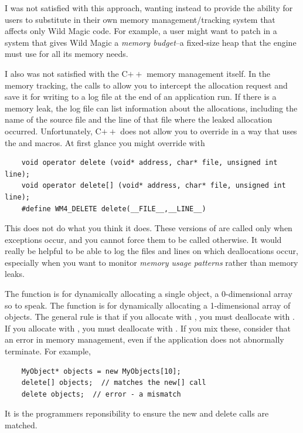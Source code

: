 \documentclass{article}
\begin{document}
I was not satisfied with this approach, wanting instead to provide the
ability for users to substitute in their own memory management/tracking
system that affects only Wild Magic code.  For example, a user might want
to patch in a system that gives Wild Magic a {\em memory budget}--a
fixed-size heap that the engine must use for all its memory needs.

I also was not satisfied with the C$++$ memory management itself.  In
the memory tracking, the calls to 
allow you to intercept the allocation request and save it for writing
to a log file at the end of an application run.  If there is a memory
leak, the log file can list information about the allocations, including
the name of the source file and the line of that file where the leaked
allocation occurred.  Unfortunately, C$++$ does not allow you to override
 in a way that uses the  and
 macros.  At first glance you might override with
\begin{verbatim}
    void operator delete (void* address, char* file, unsigned int line);
    void operator delete[] (void* address, char* file, unsigned int line);
    #define WM4_DELETE delete(__FILE__,__LINE__)
\end{verbatim}
This does not do what you think it does.  These versions of 
are called only when exceptions occur, and you cannot force them to be
called otherwise.  It would really be helpful to be able to log the files
and lines on which deallocations occur, especially when you want to monitor
{\em memory usage patterns} rather than memory leaks.

The  function is for dynamically allocating a single object,
a 0-dimensional array so to speak.  The  function is for
dynamically allocating a 1-dimensional array of objects.  The general rule is
that if you allocate with , you must deallocate with
.  If you allocate with , you must
deallocate with .  If you mix these, consider that
an error in memory management, even if the application does not abnormally
terminate.  For example,
\begin{verbatim}
    MyObject* objects = new MyObjects[10];
    delete[] objects;  // matches the new[] call
    delete objects;  // error - a mismatch
\end{verbatim}
It is the programmers reponsibility to ensure the new and delete calls are
matched.
\end{document}
